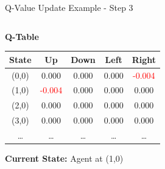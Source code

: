 \documentclass[aspectratio=169]{beamer}
\begin{document}
\begin{frame}{Q-Value Update Example - Step 3}
    
    \begin{columns}
        \begin{column}{0.45\textwidth}
            \textbf{Q-Table}
            \small
            \begin{table}[h]
                \centering
                \begin{tabular}{|c|c|c|c|c|}
                    \hline
                    \textbf{State} & \textbf{Up} & \textbf{Down} & \textbf{Left} & \textbf{Right} \\
                    \hline
                    (0,0) & 0.000 & 0.000 & 0.000 & \textcolor{red}{-0.004} \\
                    (1,0) & \textcolor{red}{-0.004} & 0.000 & 0.000 & 0.000 \\
                    (2,0) & 0.000 & 0.000 & 0.000 & 0.000 \\
                    (3,0) & 0.000 & 0.000 & 0.000 & 0.000 \\
                    \dots & \dots & \dots & \dots & \dots \\
                    \hline
                \end{tabular}
            \end{table}
            
            \textbf{Current State:} Agent at (1,0)


        \end{column}
        

\end{columns}
\end{frame}
\end{document}
